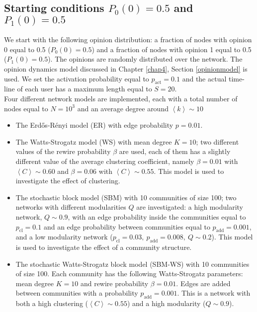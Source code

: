 \documentclass[11 pt , letterpaper , twoside , openright]{book}
\begin{document}
\subsection{Starting conditions $P_0(0) = 0.5$ and $P_1(0)=0.5$}
\label{50-50}
We start with the following opinion distribution: a fraction of nodes with opinion 0 equal to 0.5 ($P_0(0) = 0.5$) and a fraction of nodes with opinion 1 equal to 0.5 ($P_1(0) = 0.5$). The opinions are randomly distributed over the network. The opinion dynamics model discussed in Chapter \ref{chap4}, Section \ref{opinionmodel} %
is used. We set the activation probability equal to $p_{\text{act}} = 0.1$ and the actual time-line of each user has a maximum length equal to $S=20$.\\
\newline
Four different network models are implemented, each with a total number of nodes equal to $N = 10^3$ and an average degree around $\left<k\right> \sim 10$
\begin{itemize}
	\item The Erd\H{o}s-R\'{e}nyi model (ER) with edge probability $p = 0.01$.
	\item The Watts-Strogatz model (WS) with mean degree $K=10$; two different values of the rewire probability $\beta$ are used, each of them has a slightly different value of the average clustering coefficient, namely $\beta = 0.01$ with $\left<C\right> \sim 0.60$ and $\beta = 0.06$ with $\left<C\right> \sim 0.55$. This model is used to investigate the effect of clustering.
	\item The stochastic block model (SBM) with 10 communities of size 100; two networks with different modularities $Q$ are investigated: a high modularity network, $Q \sim 0.9$, with an edge probability inside the communities equal to $p_{\text{cl}} = 0.1$ and an edge probability between communities equal to $p_{\text{add}} = 0.001$, and a low modularity network ($p_{\text{cl}} = 0.03,\ p_{\text{add}} = 0.008,\ Q \sim 0.2$). This model is used to investigate the effect of a community structure.
	\item The stochastic Watts-Strogatz block model (SBM-WS) with 10 communities of size 100. Each community has the following Watts-Strogatz parameters: mean degree $K =10$ and rewire probability $\beta = 0.01$. Edges are added between communities with a probability $p_{\text{add}} = 0.001$. This is a network with both a high clustering ($\left<C\right> \sim 0.55$) and a high modularity ($Q \sim 0.9$).
\end{itemize}
\end{document}
